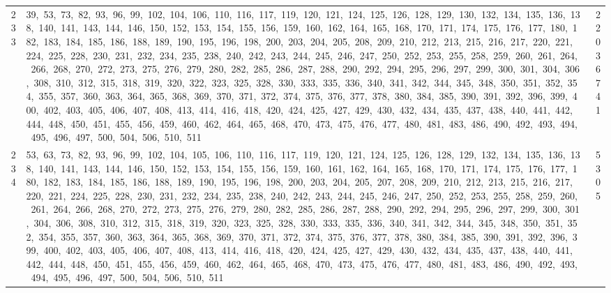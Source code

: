 \begin{longtable}{c|p{}|r}
233 & 39,\ 53,\ 73,\ 82,\ 93,\ 96,\ 99,\ 102,\ 104,\ 106,\ 110,\ 116,\ 117,\ 119,\ 120,\ 121,\ 124,\ 125,\ 126,\ 128,\ 129,\ 130,\ 132,\ 134,\ 135,\ 136,\ 138,\ 140,\ 141,\ 143,\ 144,\ 146,\ 150,\ 152,\ 153,\ 154,\ 155,\ 156,\ 159,\ 160,\ 162,\ 164,\ 165,\ 168,\ 170,\ 171,\ 174,\ 175,\ 176,\ 177,\ 180,\ 182,\ 183,\ 184,\ 185,\ 186,\ 188,\ 189,\ 190,\ 195,\ 196,\ 198,\ 200,\ 203,\ 204,\ 205,\ 208,\ 209,\ 210,\ 212,\ 213,\ 215,\ 216,\ 217,\ 220,\ 221,\ 224,\ 225,\ 228,\ 230,\ 231,\ 232,\ 234,\ 235,\ 238,\ 240,\ 242,\ 243,\ 244,\ 245,\ 246,\ 247,\ 250,\ 252,\ 253,\ 255,\ 258,\ 259,\ 260,\ 261,\ 264,\ 266,\ 268,\ 270,\ 272,\ 273,\ 275,\ 276,\ 279,\ 280,\ 282,\ 285,\ 286,\ 287,\ 288,\ 290,\ 292,\ 294,\ 295,\ 296,\ 297,\ 299,\ 300,\ 301,\ 304,\ 306,\ 308,\ 310,\ 312,\ 315,\ 318,\ 319,\ 320,\ 322,\ 323,\ 325,\ 328,\ 330,\ 333,\ 335,\ 336,\ 340,\ 341,\ 342,\ 344,\ 345,\ 348,\ 350,\ 351,\ 352,\ 354,\ 355,\ 357,\ 360,\ 363,\ 364,\ 365,\ 368,\ 369,\ 370,\ 371,\ 372,\ 374,\ 375,\ 376,\ 377,\ 378,\ 380,\ 384,\ 385,\ 390,\ 391,\ 392,\ 396,\ 399,\ 400,\ 402,\ 403,\ 405,\ 406,\ 407,\ 408,\ 413,\ 414,\ 416,\ 418,\ 420,\ 424,\ 425,\ 427,\ 429,\ 430,\ 432,\ 434,\ 435,\ 437,\ 438,\ 440,\ 441,\ 442,\ 444,\ 448,\ 450,\ 451,\ 455,\ 456,\ 459,\ 460,\ 462,\ 464,\ 465,\ 468,\ 470,\ 473,\ 475,\ 476,\ 477,\ 480,\ 481,\ 483,\ 486,\ 490,\ 492,\ 493,\ 494,\ 495,\ 496,\ 497,\ 500,\ 504,\ 506,\ 510,\ 511 & 22036741 \\
234 & 53,\ 63,\ 73,\ 82,\ 93,\ 96,\ 99,\ 102,\ 104,\ 105,\ 106,\ 110,\ 116,\ 117,\ 119,\ 120,\ 121,\ 124,\ 125,\ 126,\ 128,\ 129,\ 132,\ 134,\ 135,\ 136,\ 138,\ 140,\ 141,\ 143,\ 144,\ 146,\ 150,\ 152,\ 153,\ 154,\ 155,\ 156,\ 159,\ 160,\ 161,\ 162,\ 164,\ 165,\ 168,\ 170,\ 171,\ 174,\ 175,\ 176,\ 177,\ 180,\ 182,\ 183,\ 184,\ 185,\ 186,\ 188,\ 189,\ 190,\ 195,\ 196,\ 198,\ 200,\ 203,\ 204,\ 205,\ 207,\ 208,\ 209,\ 210,\ 212,\ 213,\ 215,\ 216,\ 217,\ 220,\ 221,\ 224,\ 225,\ 228,\ 230,\ 231,\ 232,\ 234,\ 235,\ 238,\ 240,\ 242,\ 243,\ 244,\ 245,\ 246,\ 247,\ 250,\ 252,\ 253,\ 255,\ 258,\ 259,\ 260,\ 261,\ 264,\ 266,\ 268,\ 270,\ 272,\ 273,\ 275,\ 276,\ 279,\ 280,\ 282,\ 285,\ 286,\ 287,\ 288,\ 290,\ 292,\ 294,\ 295,\ 296,\ 297,\ 299,\ 300,\ 301,\ 304,\ 306,\ 308,\ 310,\ 312,\ 315,\ 318,\ 319,\ 320,\ 323,\ 325,\ 328,\ 330,\ 333,\ 335,\ 336,\ 340,\ 341,\ 342,\ 344,\ 345,\ 348,\ 350,\ 351,\ 352,\ 354,\ 355,\ 357,\ 360,\ 363,\ 364,\ 365,\ 368,\ 369,\ 370,\ 371,\ 372,\ 374,\ 375,\ 376,\ 377,\ 378,\ 380,\ 384,\ 385,\ 390,\ 391,\ 392,\ 396,\ 399,\ 400,\ 402,\ 403,\ 405,\ 406,\ 407,\ 408,\ 413,\ 414,\ 416,\ 418,\ 420,\ 424,\ 425,\ 427,\ 429,\ 430,\ 432,\ 434,\ 435,\ 437,\ 438,\ 440,\ 441,\ 442,\ 444,\ 448,\ 450,\ 451,\ 455,\ 456,\ 459,\ 460,\ 462,\ 464,\ 465,\ 468,\ 470,\ 473,\ 475,\ 476,\ 477,\ 480,\ 481,\ 483,\ 486,\ 490,\ 492,\ 493,\ 494,\ 495,\ 496,\ 497,\ 500,\ 504,\ 506,\ 510,\ 511 & 5305 \\

\end{longtable}
